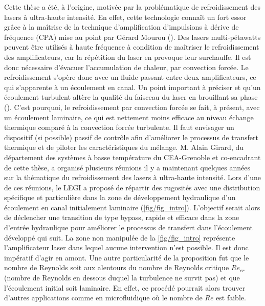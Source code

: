 Cette thèse a été, à l'origine, motivée par la problématique de refroidissement des lasers à ultra-haute intensité. En effet, cette technologie connaît un fort essor grâce à la maîtrise de la technique d'amplification d'impulsions à dérive de fréquence (CPA) mise au point par Gérard Mourou (\citet{Strickland1985}). Des lasers multi-pétawatts peuvent être utilisés à haute fréquence à condition de maîtriser le refroidissement des amplificateurs, car la répétition du laser en provoque leur surchauffe. Il est donc nécessaire d’évacuer l'accumulation de chaleur, par convection forcée. Le refroidissement s’opère donc avec un fluide passant entre deux amplificateurs, ce qui s’apparente à un écoulement en canal. Un point important à préciser et qu’un écoulement turbulent altère la qualité du faisceau du laser en brouillant sa phase (\cite{Bellec2019}). C'est pourquoi, le refroidissement par convection forcée se fait, à présent, avec un écoulement laminaire, ce qui est nettement moins efficace au niveau échange thermique comparé à la convection forcée turbulente. Il faut envisager un dispositif (si possible) passif de contrôle afin d'améliorer le processus de transfert thermique et de piloter les caractéristiques du mélange. M. Alain Girard, du département des systèmes à basse température du CEA-Grenoble et co-encadrant de cette thèse, a organisé plusieurs réunions il y a maintenant quelques années sur la thématique du refroidissement des lasers à ultra-haute intensité. Lors d'une de ces réunions, le LEGI a proposé de répartir des rugosités avec une distribution spécifique et particulière dans la zone de développement hydraulique d'un écoulement en canal initialement laminaire (\cref{fig/fig_intro}). L'objectif serait alors de déclencher une transition de type bypass, rapide et efficace dans la zone d'entrée hydraulique pour améliorer le processus de transfert dans l'écoulement développé qui suit. La zone non manipulée de la \cref{fig/fig_intro} représente l'amplificateur laser dans lequel aucune intervention n'est possible. Il est donc impératif d'agir en amont. Une autre particularité de la proposition fut que le nombre de Reynolds soit aux alentours du nombre de Reynolds critique $Re_{cr}$ (nombre de Reynolds en dessous duquel la turbulence ne survit pas) et que l’écoulement initial soit laminaire. En effet, ce procédé pourrait alors trouver d'autres applications comme en microfluidique où le nombre de $Re$ est faible.\\

